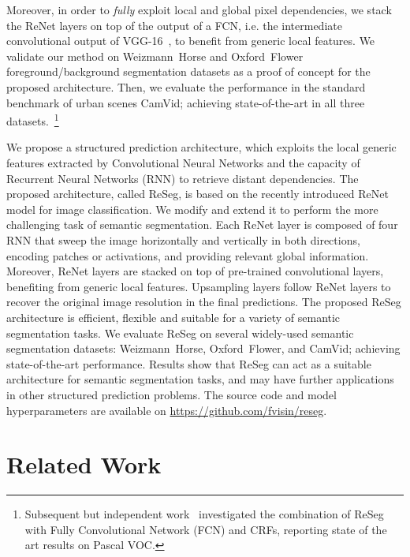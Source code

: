 Moreover, in order to {\em fully} exploit local and global pixel dependencies,
we stack the
ReNet layers on top of the output of a FCN, i.e. the intermediate convolutional
output of VGG-16~\cite{Simonyan2015}, to benefit from generic local features.
We validate our method on Weizmann~Horse and Oxford~Flower
foreground/background segmentation datasets as a proof of concept for the
proposed architecture.  Then, we evaluate the performance in the standard
benchmark of urban scenes CamVid; achieving state-of-the-art in all three
datasets.~\footnote{Subsequent but independent
work~\cite{DBLP:journals/corr/YanZJBY16} investigated the combination of ReSeg
with Fully Convolutional Network (FCN) and CRFs, reporting state of the art
results on Pascal VOC.}

We propose a structured prediction architecture, which exploits the local
generic features extracted by Convolutional Neural Networks and the capacity of
Recurrent Neural Networks (RNN) to retrieve distant dependencies. The proposed
architecture, called ReSeg, is based on the recently introduced ReNet model for
image classification. We modify and extend it to perform the more challenging
task of semantic segmentation. Each ReNet layer is composed of four RNN that
sweep the image horizontally and vertically in both directions, encoding
patches or activations, and providing relevant global information. Moreover,
ReNet layers are stacked on top of pre-trained convolutional layers, benefiting
from generic local features. Upsampling layers follow ReNet layers to recover
the original image resolution in the final predictions. The proposed ReSeg
architecture is efficient, flexible and suitable for a variety of semantic
segmentation tasks. We evaluate ReSeg on several widely-used semantic
segmentation datasets: Weizmann~Horse, Oxford~Flower, and CamVid; achieving
state-of-the-art performance. Results show that ReSeg can act as a suitable
architecture for semantic segmentation tasks, and may have further applications
in other structured prediction problems. The source code and model
hyperparameters are available on
\href{https://github.com/fvisin/reseg}{https://github.com/fvisin/reseg}.


\section{Related Work}

